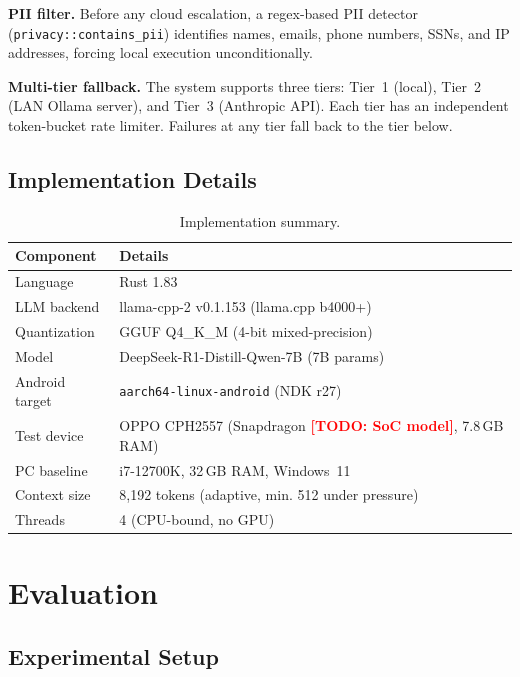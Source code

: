 \documentclass[11pt]{article}
\newcommand{\TODO}[1]{\textcolor{red}{\textbf{[TODO: #1]}}}
\begin{document}
\textbf{PII filter.}
Before any cloud escalation, a regex-based PII detector
(\texttt{privacy::contains\_pii}) identifies names, emails, phone
numbers, SSNs, and IP addresses, forcing local execution unconditionally.

\textbf{Multi-tier fallback.}
The system supports three tiers: Tier~1 (local), Tier~2 (LAN Ollama
server), and Tier~3 (Anthropic API).
Each tier has an independent token-bucket rate limiter.
Failures at any tier fall back to the tier below.

\subsection{Implementation Details}
\label{sec:impl}

\begin{table}[h]
\centering
\caption{Implementation summary.}
\label{tab:impl}
\begin{tabular}{ll}
\toprule
Component & Details \\
\midrule
Language & Rust 1.83 \\
LLM backend & llama-cpp-2 v0.1.153 (llama.cpp b4000+) \\
Quantization & GGUF Q4\_K\_M (4-bit mixed-precision) \\
Model & DeepSeek-R1-Distill-Qwen-7B (7B params) \\
Android target & \texttt{aarch64-linux-android} (NDK r27) \\
Test device & OPPO CPH2557 (Snapdragon \TODO{SoC model}, 7.8\,GB RAM) \\
PC baseline & i7-12700K, 32\,GB RAM, Windows~11 \\
Context size & 8,192 tokens (adaptive, min. 512 under pressure) \\
Threads & 4 (CPU-bound, no GPU) \\
\bottomrule
\end{tabular}
\end{table}

\section{Evaluation}
\label{sec:eval}

\subsection{Experimental Setup}
\end{document}
